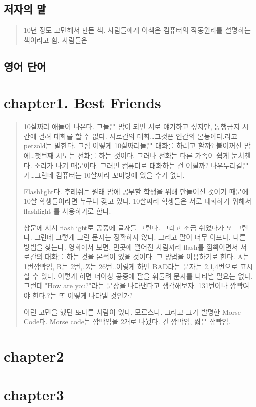 \documentclass[11pt]{article}
\begin{document}
\subsection{저자의 말}
\label{sec:orga3006b7}
\begin{quote}
10년 정도 고민해서 만든 책. 사람들에게 이책은 컴퓨터의 작동원리를 설명하는 책이라고 함. 사람들은 
\end{quote}
\subsection{영어 단어}
\label{sec:org78619ce}

\section{chapter1. Best Friends}
\label{sec:org37677f2}
\begin{note}
\begin{quote}
 10살짜리 애들이 나온다. 그들은 밤이 되면 서로 얘기하고 싶지만, 통행금지 시간에
걸려 대화를 할 수 없다. 서로간의 대화\ldots{}그것은 인간의 본능이다.라고 petzold는
말한다.
그럼 어떻게 10살짜리들은 대화를 하려고 할까? 불이꺼진 밤에\ldots{}첫번째 시도는 전화를
하는 것이다. 그러나 전화는 다른 가족이 쉽게 눈치챈다. 소리가 나기 때문이다. 그러면
컴퓨터로 대화하는 건 어떨까? 나우누리같은거\ldots{}그런데 컴퓨터는 10살짜리 꼬마방에
있을 수가 없다.

Flashlight다. 후레쉬는 원래 밤에 공부할 학생을 위해 만들어진 것이기 때문에 10살
학생들이라면 누구나 갖고 있다. 10살짜리 학생들은 서로 대화하기 위해서 flashlight
를 사용하기로 한다.

창문에 서서 flashlight로 공중에 글자를 그린다. 그리고 조금 쉬었다가 또 그린다. 그런데
그렇게 그린 문자는 정확하지 않다. 그리고 팔이 너무 아프다. 다른 방법을 찾는다. 
영화에서 보면, 먼곳에 떨어진 사람끼리 flash를 깜빡이면서 서로간의 대화를 하는 것을
본적이 있을 것이다. 그 방법을 이용하기로 한다. A는 1번깜빡임, B는 2번,..Z는 26번..이렇게
하면 BAD라는 문자는 2,1,4번으로 표시할 수 있다. 이렇게 하면 더이상 공중에 팔을 휘둘려
문자를 나타낼 필요는 없다. 그런데 "How are you?"라는 문장을 나타낸다고 생각해보자. 
131번이나 깜빡여야 한다.?는 또 어떻게 나타낼 것인가?

이런 고민을 했던 또다른 사람이 있다. 모르스다. 그리고 그가 발명한 Morse Code다.
Morse code는 깜빡임을 2개로 나눴다. 긴 깜박임, 짧은 깜빡임. 
\end{quote}
\end{note}
\section{chapter2}
\label{sec:orgc2c669b}
\section{chapter3}
\label{sec:org9164a16}
\end{document}
